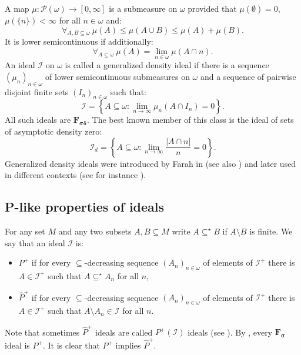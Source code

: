 \documentclass{amsart}
\theoremstyle{plain}
\theoremstyle{definition}
\theoremstyle{remark}
\newcommand{\cI}{\mathcal{I}}
\newcommand{\I}{\cI}
\begin{document}
A map $\mu:\mathcal{P}(\omega)\to[0,\infty]$ is a submeasure on $\omega$ provided that $\mu(\emptyset)=0$, $\mu(\{n\})<\infty$ for all $n\in\omega$ and:
$$\forall_{A,B\subseteq\omega}\ \mu(A)\leq\mu(A\cup B)\leq \mu(A)+\mu(B)\text{.}$$
It is lower semicontinuous if additionally:
$$\forall_{A\subseteq\omega}\ \mu(A)=\lim_{n\in\omega}\mu(A\cap n)\text{.}$$
An ideal $\I$ on $\omega$ is called a generalized density ideal if there is a sequence $(\mu_n)_{n \in \omega}$ of lower semicontinuous submeasures on $\omega$ and a sequence of pairwise disjoint finite sets $(I_n)_{n \in \omega}$ such that: 
$$\I=\left\{A \subseteq \omega: \lim_{n \rightarrow \infty} \mu_n(A\cap I_n)=0\right\}\text{.}$$ 
All such ideals are $\mathbf{F_{\sigma\delta}}$. The best known member of this class is the ideal of sets of asymptotic density zero:
\[
\I_d=\left\{A\subseteq\omega:\lim_{n\to\infty}\frac{|A\cap n|}{n}=0\right\}\text{.}
\]
Generalized density ideals were introduced by Farah in \cite[Section 2.10]{MR1988247} (see also \cite{MR2254542}) and later used in different contexts (see for instance \cite{MR3436368, MR2320288, MR4404626, MR3968131}). 


\subsection{P-like properties of ideals}

For any set $M$ and any two subsets $A,B\subseteq M$ write $A\subseteq^\star B$ if $A\setminus B$ is finite. We say that an ideal $\I$ is:
\begin{itemize}
\item $P^+$ if for every $\subseteq$-decreasing sequence $(A_n)_{n\in\omega}$ of elements of $\I^+$ there is $A\in\I^+$ such that $A\subseteq^\star A_n$ for all $n$,
\item $\widehat{P}^+$ if for every $\subseteq$-decreasing sequence $(A_n)_{n\in\omega}$ of elements of $\I^+$ there is $A\in\I^+$ such that $A\setminus A_n\in\I$ for all $n$.
\end{itemize}
Note that sometimes $\widehat{P}^+$ ideals are called $P^+(\I)$ ideals (see \cite{zbMATH07566290}). By \cite[Lemma 1.2]{MR748847}, every $\mathbf{F_\sigma}$ ideal is $P^+$. It is clear that $P^+$ implies $\widehat{P}^+$. 
\end{document}
